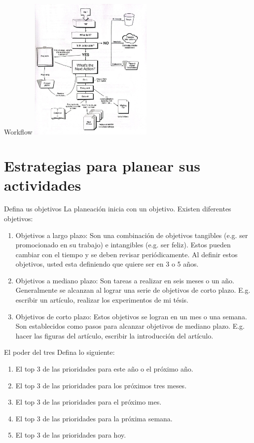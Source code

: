 \documentclass[
10pt,
aspectratio=169,
]{beamer}
\begin{document}
\begin{frame}[c]{Workflow}
\centering
\includegraphics[width=0.45\textwidth]{workf.jpeg}
\end{frame}
\section{Estrategias para planear sus actividades}
\begin{frame}[c]{Defina us objetivos}
La planeaci\'on inicia con un objetivo. Existen diferentes objetivos:
\begin{enumerate}
\item \alert{Objetivos a largo plazo}: Son una combinaci\'on de objetivos tangibles (e.g. ser promocionado en su trabajo) e intangibles (e.g. ser feliz). Estos pueden cambiar con el tiempo y se deben revisar peri\'odicamente. Al definir estos objetivos, usted esta definiendo que quiere ser en 3 o 5 a\~nos.
\item \alert{Objetivos a mediano plazo}: Son tareas a realizar en seis meses o un a\~no. Generalmente se alcanzan al lograr una serie de objetivos de corto plazo. E.g. escribir un art\'iculo, realizar los experimentos de mi t\'esis. 
\item \alert{Objetivos de corto plazo}: Estos objetivos se logran en un mes o una semana. Son establecidos como pasos para alcanzar objetivos de mediano plazo. E.g. hacer las figuras del art\'iculo, escribir la introducci\'on del art\'iculo. 
\end{enumerate}
\end{frame}

\begin{frame}[c]{El poder del tres}
Defina lo siguiente:
\begin{enumerate}
\item El top 3 de las prioridades para este a\~no o el pr\'oximo a\~no.
\item El top 3 de las prioridades para los pr\'oximos tres meses. 
\item El top 3 de las prioridades para el pr\'oximo mes.
\item El top 3 de las prioridades para la pr\'oxima semana.
\item El top 3 de las prioridades para hoy.
\end{enumerate}
\end{frame}
\end{document}
